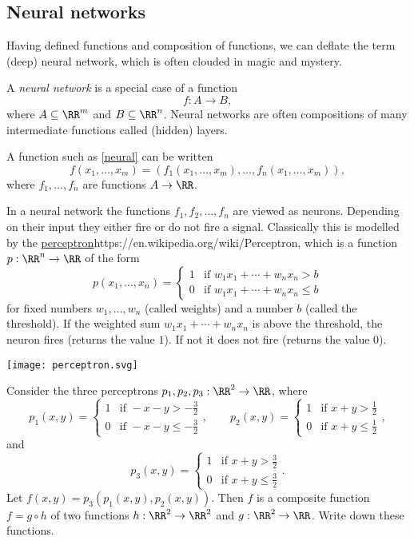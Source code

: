 \documentclass{article}
\begin{document}
\subsection{Neural networks}

Having defined functions and composition of functions, we can deflate
the term (deep) neural network, which is often clouded in
magic and mystery.

A \emph{neural network} is a special case of a function
\begin{equation}\label{neural}
f: A\rightarrow B,
\end{equation}
where $A\subseteq \RR^m$ and $B\subseteq \RR^n$. Neural networks are
often compositions of many intermediate functions called
(hidden) layers.

A function such as \eqref{neural} can
be written
$$
f(x_1, \dots, x_m) = \left(
f_1(x_1, \dots, x_m), \dots, f_n(x_1, \dots, x_m)\right),
$$
where $f_1, \dots, f_n$ are functions $A\rightarrow \RR$.

In a neural
network the functions $f_1, f_2, \dots, f_n$ are viewed as neurons. Depending on their
input they either fire or do not fire a signal. Classically this is
modelled by the \url{perceptron}{https://en.wikipedia.org/wiki/Perceptron},
which is a function $p:\RR^n\rightarrow \RR$ of the form
$$
p(x_1, \dots, x_n) =
\begin{cases}
  1 &\text{if } w_1 x_1 + \cdots + w_n x_n > b\\
  0 &\text{if } w_1 x_1 + \cdots + w_n x_n \leq b
\end{cases}
$$  
  for fixed numbers $w_1, \dots, w_n$ (called weights) and a number $b$ (called the threshold).
  If the weighted sum $w_1 x_1 + \cdots + w_n x_n$ is above the threshold, the neuron
  fires (returns the value $1$). If not it does not fire (returns the value $0$).

\texttt{[image: perceptron.svg]}


  \beginshex
  Consider the three perceptrons $p_1, p_2, p_3: \RR^2\rightarrow \RR$, where
  $$
p_1(x, y) =
\begin{cases}
  1 &\text{if } -x-y > -\frac{3}{2}\\
  0 &\text{if } -x-y \leq -\frac{3}{2}
\end{cases},
\qquad
p_2(x, y) =
\begin{cases}
  1 &\text{if } x + y > \frac{1}{2}\\
  0 &\text{if } x + y \leq \frac{1}{2}
\end{cases},
$$
and
$$
p_3(x, y) =
\begin{cases}
  1 &\text{if } x + y > \frac{3}{2}\\
  0 &\text{if } x + y \leq \frac{3}{2}
\end{cases}.
$$
Let $f(x, y) = p_3 (p_1(x, y), p_2(x, y))$. Then $f$ is
a composite function $f = g\circ h$ of two functions $h: \RR^2\rightarrow \RR^2$
and $g: \RR^2\rightarrow \RR$. Write down these functions.
\end{document}
